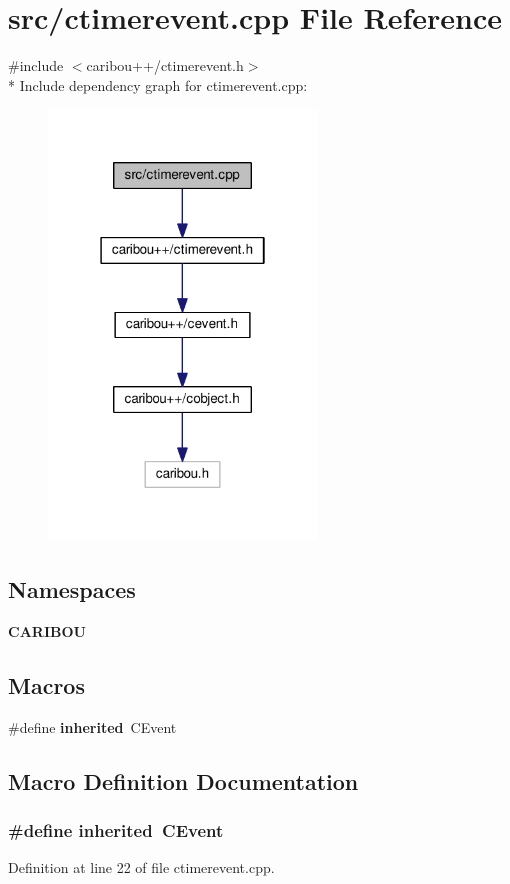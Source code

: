 \section{src/ctimerevent.cpp File Reference}
\label{ctimerevent_8cpp}
{\ttfamily \#include $<$caribou++/ctimerevent.\+h$>$}\\*
Include dependency graph for ctimerevent.\+cpp\+:
\nopagebreak
\begin{figure}[H]
\begin{center}
\leavevmode
\includegraphics[width=202pt]{ctimerevent_8cpp__incl}
\end{center}
\end{figure}
\subsection*{Namespaces}
\begin{DoxyCompactItemize}
\item 
 {\bf C\+A\+R\+I\+B\+OU}
\end{DoxyCompactItemize}
\subsection*{Macros}
\begin{DoxyCompactItemize}
\item 
\#define {\bf inherited}~C\+Event
\end{DoxyCompactItemize}


\subsection{Macro Definition Documentation}
\subsubsection[{inherited}]{\setlength{\rightskip}{0pt plus 5cm}\#define inherited~C\+Event}\label{ctimerevent_8cpp_a3920e3b7cb0909b941b2409493acf8f1}


Definition at line 22 of file ctimerevent.\+cpp.

